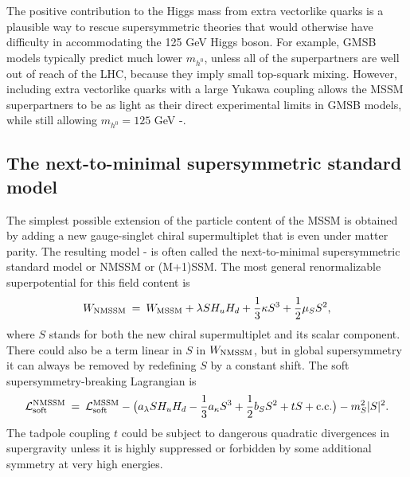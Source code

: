 \documentclass[12pt]{article}
\def\beq{\begin{eqnarray}}
\def\eeq{\end{eqnarray}}
\def\conj{{{\rm c.c.}}}
\begin{document}
The positive contribution to the Higgs mass from extra vectorlike quarks 
is a plausible way to rescue supersymmetric theories that 
would otherwise have difficulty in accommodating the 125 GeV Higgs boson. For example,
GMSB models typically predict much lower $m_{h^0}$, unless all of the superpartners are 
well out of reach of the LHC, because they imply small top-squark mixing. 
However, including extra vectorlike quarks with a large Yukawa coupling
allows the MSSM superpartners to be as light as their direct experimental 
limits in GMSB models, while still allowing
$m_{h^0} = 125$ GeV 
\cite{Endo:2011mc}-\cite{Martin:2012dg}.

\subsection{The next-to-minimal supersymmetric standard
model}\label{subsec:variations.NMSSM}
\setcounter{equation}{0}

The simplest possible extension of the particle content of the MSSM is 
obtained by adding a new gauge-singlet chiral supermultiplet that is 
even under matter parity. The resulting model 
\cite{NMSSM}-\cite{nMSSM} 
is often 
called the next-to-minimal supersymmetric standard model or NMSSM or 
(M+1)SSM. The most general renormalizable superpotential for this field 
content is
\beq
W_{\rm NMSSM} \>=\> W_{\rm MSSM}
+ \lambda S H_u H_d + \frac{1}{3} \kappa S^3 + \frac{1}{2} \mu_S S^2  ,
\label{NMSSMwww}
\eeq
where $S$ stands for both the new chiral supermultiplet and its scalar 
component. There could also be a term linear in $S$ in $W_{\rm NMSSM}$, 
but in global supersymmetry it can always be removed by redefining $S$ by 
a constant shift. The soft supersymmetry-breaking Lagrangian is
\beq
{\cal L}_{\rm soft}^{\rm NMSSM} \>=\> {\cal L}_{\rm soft}^{\rm MSSM}
-\bigl (
a_{\lambda} S H_u H_d - {1\over 3} a_\kappa S^3 + {1\over 2} b_S S^2
+ t S
+ \conj \bigr ) -m_S^2 |S|^2
.
\label{eq:NMSSMsoft}
\eeq
The tadpole coupling $t$ could be subject to dangerous quadratic 
divergences in supergravity \cite{NMSSMtadpole} unless it is highly 
suppressed or forbidden by some additional symmetry at very high energies.
\end{document}
